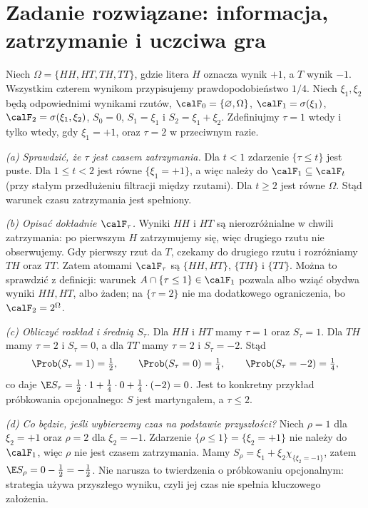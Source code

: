 \section{Zadanie rozwiązane: informacja, zatrzymanie i uczciwa gra}
\begin{zadanie}
Niech $\Omega=\{HH,HT,TH,TT\}$, gdzie litera $H$
oznacza wynik $+1$, a $T$ wynik $-1$.
Wszystkim czterem wynikom przypisujemy prawdopodobieństwo $1/4$.
Niech $\xi_1,\xi_2$ będą odpowiednimi wynikami
rzutów, $\calF_0=\{\varnothing,\Omega\}$,
$\calF_1=\sigma(\xi_1)$, $\calF_2=\sigma(\xi_1,\xi_2)$,
$S_0=0$, $S_1=\xi_1$ i $S_2=\xi_1+\xi_2$.
Zdefiniujmy $\tau=1$ wtedy i tylko wtedy, gdy
$\xi_1=+1$, oraz $\tau=2$ w przeciwnym razie.

\emph{(a) Sprawdzić, że $\tau$ jest czasem zatrzymania.}
Dla $t<1$ zdarzenie $\{\tau\le t\}$ jest puste.
Dla $1\le t<2$ jest równe $\{\xi_1=+1\}$,
a więc należy do $\calF_1\subseteq\calF_t$
(przy stałym przedłużeniu filtracji między rzutami).
Dla $t\ge2$ jest równe $\Omega$. Stąd warunek czasu
zatrzymania jest spełniony.

\emph{(b) Opisać dokładnie $\calF_\tau$.}
Wyniki $HH$ i $HT$ są nierozróżnialne w chwili
zatrzymania: po pierwszym $H$ zatrzymujemy się,
więc drugiego rzutu nie obserwujemy. Gdy pierwszy
rzut da $T$, czekamy do drugiego rzutu i rozróżniamy
$TH$ oraz $TT$. Zatem atomami $\calF_\tau$ są
$\{HH,HT\}$, $\{TH\}$ i $\{TT\}$.
Można to sprawdzić z definicji: warunek
$A\cap\{\tau\le1\}\in\calF_1$ pozwala
albo wziąć obydwa wyniki $HH,HT$, albo żaden;
na $\{\tau=2\}$ nie ma dodatkowego ograniczenia,
bo $\calF_2=2^\Omega$.

\emph{(c) Obliczyć rozkład i średnią $S_\tau$.}
Dla $HH$ i $HT$ mamy $\tau=1$ oraz $S_\tau=1$.
Dla $TH$ mamy $\tau=2$ i $S_\tau=0$,
a dla $TT$ mamy $\tau=2$ i $S_\tau=-2$. Stąd
\[
\Prob(S_\tau=1)=\tfrac12,\qquad
\Prob(S_\tau=0)=\tfrac14,\qquad
\Prob(S_\tau=-2)=\tfrac14,
\]
co daje $\E S_\tau=\tfrac12\cdot1+
\tfrac14\cdot0+\tfrac14\cdot(-2)=0$.
Jest to konkretny przykład próbkowania opcjonalnego:
$S$ jest martyngałem, a $\tau\le2$.

\emph{(d) Co będzie, jeśli wybierzemy czas na podstawie przyszłości?}
Niech $\rho=1$ dla $\xi_2=+1$ oraz $\rho=2$
dla $\xi_2=-1$. Zdarzenie $\{\rho\le1\}
=\{\xi_2=+1\}$ nie należy do $\calF_1$,
więc $\rho$ nie jest czasem zatrzymania.
Mamy $S_\rho=\xi_1+\xi_2\chi_{\{\xi_2=-1\}}$,
zatem $\E S_\rho=0-\tfrac12=-\tfrac12$.
Nie narusza to twierdzenia o próbkowaniu opcjonalnym:
strategia używa przyszłego wyniku, czyli jej czas nie
spełnia kluczowego założenia.
\end{zadanie}

